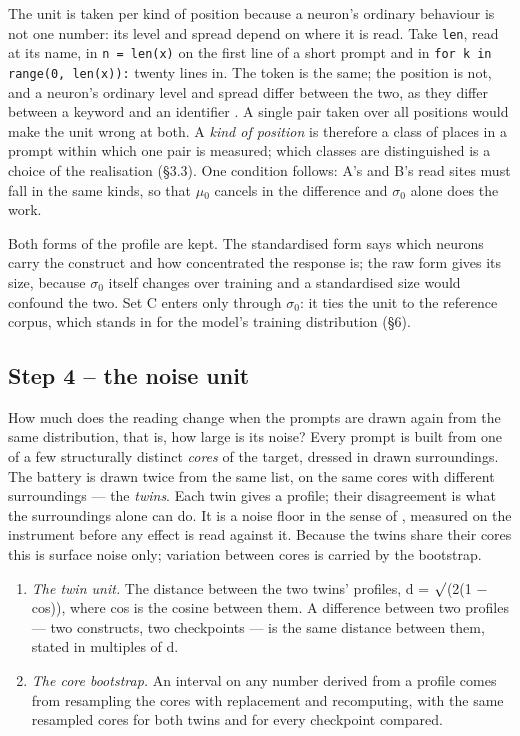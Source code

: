 \documentclass{article}
\begin{document}
The unit is taken per kind of position because a neuron's ordinary behaviour is not one number: its level and spread depend on where it is read. Take \texttt{len}, read at its name, in \texttt{n = len(x)} on the first line of a short prompt and in \texttt{for k in range(0, len(x)):} twenty lines in. The token is the same; the position is not, and a neuron's ordinary level and spread differ between the two, as they differ between a keyword and an identifier \citep{voita2024}. A single pair taken over all positions would make the unit wrong at both. A \emph{kind of position} is therefore a class of places in a prompt within which one pair is measured; which classes are distinguished is a choice of the realisation (\S3.3). One condition follows: A's and B's read sites must fall in the same kinds, so that $\mu$$_0$ cancels in the difference and $\sigma$$_0$ alone does the work.

Both forms of the profile are kept. The standardised form says which neurons carry the construct and how concentrated the response is; the raw form gives its size, because $\sigma$$_0$ itself changes over training and a standardised size would confound the two. Set C enters only through $\sigma$$_0$: it ties the unit to the reference corpus, which stands in for the model's training distribution (\S6).

\subsection{Step 4 -- the noise unit}

How much does the reading change when the prompts are drawn again from the same distribution, that is, how large is its noise? Every prompt is built from one of a few structurally distinct \emph{cores} of the target, dressed in drawn surroundings. The battery is drawn twice from the same list, on the same cores with different surroundings --- the \emph{twins}. Each twin gives a profile; their disagreement is what the surroundings alone can do. It is a noise floor in the sense of \citet{chen2026}, measured on the instrument before any effect is read against it. Because the twins share their cores this is surface noise only; variation between cores is carried by the bootstrap.

\begin{enumerate}[topsep=2pt,itemsep=1pt,parsep=0pt,partopsep=0pt,leftmargin=*]
\item \emph{The twin unit.} The distance between the two twins' profiles, d = $\surd$(2(1 $-$ cos)), where cos is the cosine between them. A difference between two profiles --- two constructs, two checkpoints --- is the same distance between them, stated in multiples of d.
\item \emph{The core bootstrap.} An interval on any number derived from a profile comes from resampling the cores with replacement and recomputing, with the same resampled cores for both twins and for every checkpoint compared.
\end{enumerate}
\end{document}
